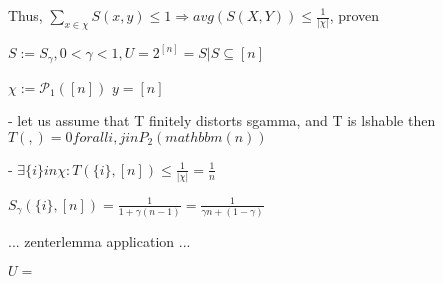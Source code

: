 	Thus, $\sum_{x \in \chi}S(x, y) \leq 1 \Rightarrow avg(S(X, Y)) \leq \frac{1}{|\chi|}$, proven
	
	
	
	
	$S:= S_\gamma , 0 < \gamma < 1, U=2^{[n]}={S|S\subseteq [n]}$ %
	
	$\chi := \mathcal{P}_1([n])$
	$y = [n]$
	
	 - let us assume that T finitely distorts sgamma, and T is lshable
	then $T({},{}) = 0 forall {i, j} in P_2(mathbbm(n))$
	
	 - $\exists \{i\} in \chi : T(\{i\}, [n]) \leq \frac{1}{|\chi|} = \frac{1}{n}$
	 
	 $S_\gamma(\{i\}, [n]) = \frac{1}{1 + \gamma(n-1)} = \frac{1}{\gamma n + (1-\gamma)}$
	 
	 ...
	 zenterlemma application
	 ...
	
	
	
	$ U = {}$